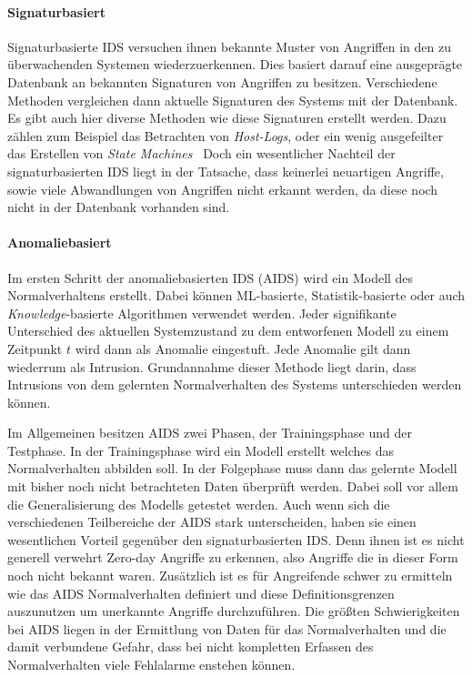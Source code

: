             \paragraph{Signaturbasiert} 
                Signaturbasierte IDS versuchen ihnen bekannte Muster von Angriffen in den zu überwachenden Systemen wiederzuerkennen.
                Dies basiert darauf eine ausgeprägte Datenbank an bekannten Signaturen von Angriffen zu besitzen.
                Verschiedene Methoden vergleichen dann aktuelle Signaturen des Systems mit der Datenbank.
                Es gibt auch hier diverse Methoden wie diese Signaturen erstellt werden. 
                Dazu zählen zum Beispiel das Betrachten von \textit{Host-Logs}, oder ein wenig ausgefeilter das Erstellen von \textit{State Machines}~\cite{SIDSstate}
                Doch ein wesentlicher Nachteil der signaturbasierten IDS liegt in der Tatsache, dass keinerlei neuartigen Angriffe, sowie viele Abwandlungen von Angriffen nicht erkannt werden,
                da diese noch nicht in der Datenbank vorhanden sind.~\cite{IDSsurvey}

            \paragraph{Anomaliebasiert}
                Im ersten Schritt der anomaliebasierten IDS (AIDS) wird ein Modell des Normalverhaltens erstellt.
                Dabei können ML-basierte, Statistik-basierte oder auch \textit{Knowledge}-basierte  Algorithmen verwendet werden.
                Jeder signifikante Unterschied des aktuellen Systemzustand zu dem entworfenen Modell zu einem Zeitpunkt $t$ wird dann als Anomalie eingestuft.
                Jede Anomalie gilt dann wiederrum als Intrusion.
                Grundannahme dieser Methode liegt darin, dass Intrusions von dem gelernten Normalverhalten des Systems unterschieden werden können.

                Im Allgemeinen besitzen AIDS zwei Phasen, der Trainingsphase und der Testphase.
                In der Trainingsphase wird ein Modell erstellt welches das Normalverhalten abbilden soll.
                In der Folgephase muss dann das gelernte Modell mit bisher noch nicht betrachteten Daten überprüft werden.
                Dabei soll vor allem die Generalisierung des Modells getestet werden. 
                Auch wenn sich die verschiedenen Teilbereiche der AIDS stark unterscheiden, haben sie einen wesentlichen Vorteil gegenüber den signaturbasierten IDS\@.
                Denn ihnen ist es nicht generell verwehrt Zero-day Angriffe zu erkennen, also Angriffe die in dieser Form noch nicht bekannt waren. 
                Zusätzlich ist es für Angreifende schwer zu ermitteln wie das AIDS Normalverhalten definiert und diese Definitionsgrenzen auszunutzen um unerkannte Angriffe durchzuführen.
                Die größten Schwierigkeiten bei AIDS liegen in der Ermittlung von Daten für das Normalverhalten und die damit verbundene Gefahr,
                dass bei nicht kompletten Erfassen des Normalverhalten viele Fehlalarme enstehen können.

